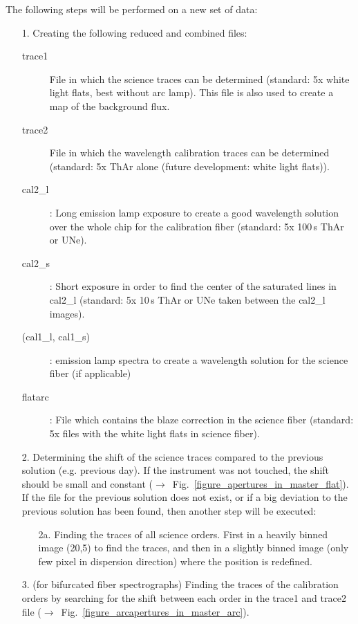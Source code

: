 \documentclass[10pt,a4paper]{article}
\begin{document}
\noindent The following steps will be performed on a new set of data:
\begin{itemize}
  \item[1.] Creating the following reduced and combined files:
  \begin{description}
    \item[trace1] File in which the science traces can be determined (standard: 5x white light flats, best without arc lamp). This file is also used to create a map of the background flux.
    \item[trace2] File in which the wavelength calibration traces can be determined (standard: 5x ThAr alone (future development: white light flats)).
    \item[cal2\_l]: Long emission lamp exposure to create a good wavelength solution over the whole chip for the calibration fiber (standard: 5x 100\,s ThAr or UNe).
    \item[cal2\_s]: Short exposure in order to find the center of the saturated lines in cal2\_l (standard: 5x 10\,s ThAr or UNe taken between the cal2\_l images).
    \item[(cal1\_l, cal1\_s)]: emission lamp spectra to create a wavelength solution for the science fiber (if applicable)
    \item[flatarc]: File which contains the blaze correction in the science fiber (standard: 5x files with the white light flats in science fiber).
  \end{description}
  \item[2.] Determining the shift of the science traces compared to the previous solution (e.g. previous day). If the instrument was not touched, the shift should be small and constant ($\rightarrow$~Fig.~\ref{figure_apertures_in_master_flat}). If the file for the previous solution does not exist, or if a big deviation to the previous solution has been found, then another step will be executed:
  \begin{itemize}
    \item[2a.] Finding the traces of all science orders. First in a heavily binned image (20,5) to find the traces, and then in a slightly binned image (only few pixel in dispersion direction) where the position is redefined.
  \end{itemize}
  \item[3.] (for bifurcated fiber spectrographs) Finding the traces of the calibration orders by searching for the shift between each order in the trace1 and trace2 file ($\rightarrow$~Fig.~\ref{figure_arcapertures_in_master_arc}). 

\end{itemize}
\end{document}
